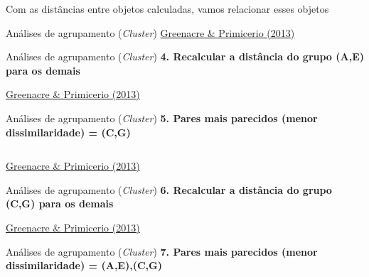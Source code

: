 \documentclass[
  ignorenonframetext,
]{beamer}
\begin{document}
\begin{frame}{Com as distâncias entre objetos calculadas, vamos
relacionar esses objetos}
\begin{block}{Análises de agrupamento (\emph{Cluster})}
\href{https://www.fbbva.es/microsite/multivariate-statistics/}{Greenacre
\& Primicerio (2013)}
\end{block}

\begin{block}{Análises de agrupamento (\emph{Cluster})}
\protect\hypertarget{anuxe1lises-de-agrupamento-cluster-3}{}
\textbf{4. Recalcular a distância do grupo (A,E) para os demais}

\href{https://www.fbbva.es/microsite/multivariate-statistics/}{Greenacre
\& Primicerio (2013)}
\end{block}

\begin{block}{Análises de agrupamento (\emph{Cluster})}
\protect\hypertarget{anuxe1lises-de-agrupamento-cluster-4}{}
\textbf{5. Pares mais parecidos (menor dissimilaridade) = (C,G)}

\begin{columns}[T]
\begin{column}{0.65\textwidth}
\end{column}

\begin{column}{0.35\textwidth}
\end{column}
\end{columns}

\href{https://www.fbbva.es/microsite/multivariate-statistics/}{Greenacre
\& Primicerio (2013)}
\end{block}

\begin{block}{Análises de agrupamento (\emph{Cluster})}
\protect\hypertarget{anuxe1lises-de-agrupamento-cluster-5}{}
\textbf{6. Recalcular a distância do grupo (C,G) para os demais}

\href{https://www.fbbva.es/microsite/multivariate-statistics/}{Greenacre
\& Primicerio (2013)}
\end{block}

\begin{block}{Análises de agrupamento (\emph{Cluster})}
\protect\hypertarget{anuxe1lises-de-agrupamento-cluster-6}{}
\textbf{7. Pares mais parecidos (menor dissimilaridade) = (A,E),(C,G)}

\begin{columns}[T]
\begin{column}{0.65\textwidth}
\end{column}

\begin{column}{0.35\textwidth}
\end{column}
\end{columns}


\end{block}
\end{frame}
\end{document}
